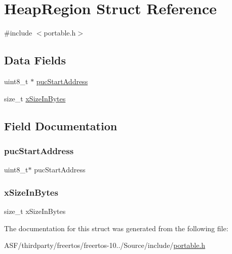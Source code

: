 \hypertarget{struct_heap_region}{}\section{Heap\+Region Struct Reference}
\label{struct_heap_region}


{\ttfamily \#include $<$portable.\+h$>$}

\subsection*{Data Fields}
\begin{DoxyCompactItemize}
\item 
uint8\+\_\+t $\ast$ \mbox{\hyperlink{struct_heap_region_a9d602a97428bd849298f05391a13968e}{puc\+Start\+Address}}
\item 
size\+\_\+t \mbox{\hyperlink{struct_heap_region_ab0ed41976d9901576b117bc7981f6c98}{x\+Size\+In\+Bytes}}
\end{DoxyCompactItemize}


\subsection{Field Documentation}
\mbox{\label{struct_heap_region_a9d602a97428bd849298f05391a13968e}} 
\subsubsection{\texorpdfstring{pucStartAddress}{pucStartAddress}}
{\footnotesize\ttfamily uint8\+\_\+t$\ast$ puc\+Start\+Address}

\mbox{\label{struct_heap_region_ab0ed41976d9901576b117bc7981f6c98}} 
\subsubsection{\texorpdfstring{xSizeInBytes}{xSizeInBytes}}
{\footnotesize\ttfamily size\+\_\+t x\+Size\+In\+Bytes}



The documentation for this struct was generated from the following file\+:\begin{DoxyCompactItemize}
\item 
A\+S\+F/thirdparty/freertos/freertos-\/10../\+Source/include/\mbox{\hyperlink{portable_8h}{portable.\+h}}\end{DoxyCompactItemize}
